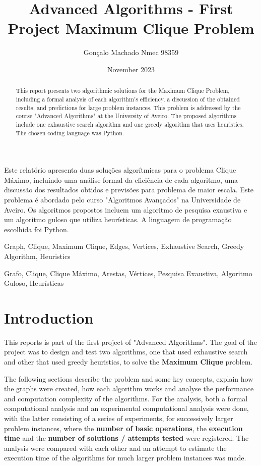 \documentclass[]{revdetua}
\title{Advanced Algorithms - First Project \linebreak Maximum Clique Problem}
\author{Gonçalo Machado Nmec 98359}
\date{November 2023}
\begin{document}
\maketitle

\begin{abstract}
This report presents two algorithmic solutions for the Maximum Clique Problem, including a formal analysis of each algorithm's efficiency, a discussion of the obtained results, and predictions for large problem instances. This problem is addressed by the course "Advanced Algorithms" at the University of Aveiro. The proposed algorithms include one exhaustive search algorithm and one greedy algorithm that uses heuristics. The chosen coding language was Python.
\end{abstract}

\begin{resumo}%
Este relatório apresenta duas soluções algorítmicas para o problema Clique Máximo, incluindo uma análise formal da eficiência de cada algoritmo, uma discussão dos resultados obtidos e previsões para problema de maior escala. Este problema é abordado pelo curso "Algoritmos Avançados" na Universidade de Aveiro. Os algoritmos propostos incluem um algoritmo de pesquisa exaustiva e um algoritmo guloso que utiliza heurísticas. A linguagem de programação escolhida foi Python.
\end{resumo}

\begin{keywords}
Graph, Clique, Maximum Clique, Edges, Vertices, Exhaustive Search, Greedy Algorithm, Heuristics
\end{keywords}

\begin{palavraschave}
Grafo, Clique, Clique Máximo, Arestas, Vértices, Pesquisa Exaustiva, Algoritmo Guloso, Heurísticas
\end{palavraschave}

\section{Introduction}
This reports is part of the first project of "Advanced Algorithms". The goal of the project was to design and test two algorithms, one that used exhaustive search and other that used greedy heuristics, to solve the \textbf{Maximum Clique} problem.

The following sections describe the problem and some key concepts, explain how the graphs were created, how each algorithm works and analyse the performance and computation complexity of the algorithms. For the analysis, both a formal computational analysis and an experimental computational analysis were done, with the latter consisting of a series of experiments, for successively larger problem instances, where the \textbf{number of basic operations}, the \textbf{execution time} and the \textbf{number of solutions / attempts tested} were registered. The analysis were compared with each other and an attempt to estimate the execution time of the algorithms for much larger problem instances was made.
\end{document}

